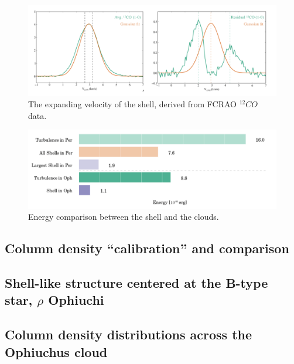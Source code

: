 \documentclass[11pt,a4paper]{emulateapj}
\begin{document}
\begin{figure}[ht]
\centering
\includegraphics[scale=0.5]{fig/v_exp}
\caption{The expanding velocity of the shell, derived from FCRAO $^{12}CO$ data.
}
\end{figure}

\begin{figure}[ht]
\centering
\includegraphics[scale=0.35]{fig/bar_energy.png}
\caption{Energy comparison between the shell and the clouds.
}
\end{figure}

\subsection{Column density ``calibration'' and comparison}

\subsection{Shell-like structure centered at the B-type star, $\rho$ Ophiuchi}

\subsection{Column density distributions across the Ophiuchus cloud}
\end{document}
